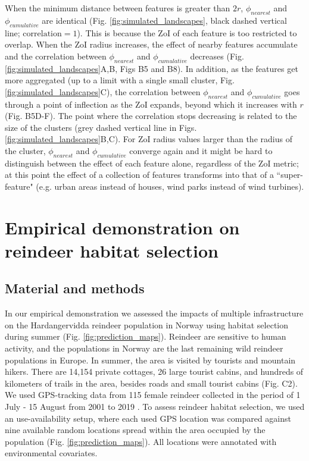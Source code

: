 \documentclass[titlepage]{article}
\begin{document}
When the minimum distance between features is greater than $2r$, $\phi_{nearest}$ and $\phi_{cumulative}$ are identical (Fig. \ref{fig:simulated_landscapes}, black dashed vertical line; $\text{correlation} = 1$). This is because the ZoI of each feature is too restricted to overlap. When the ZoI radius increases, the effect of nearby features accumulate and the correlation between $\phi_{nearest}$ and $\phi_{cumulative}$ decreases (Fig. \ref{fig:simulated_landscapes}A,B, Figs B5 and B8). In addition, as the features get more aggregated (up to a limit with a single small cluster, Fig. \ref{fig:simulated_landscapes}C), the correlation between $\phi_{nearest}$ and $\phi_{cumulative}$ goes through a point of inflection as the ZoI expands, beyond which it increases with $r$ (Fig. B5D-F). The point where the correlation stops decreasing is related to the size of the clusters (grey dashed vertical line in Figs. \ref{fig:simulated_landscapes}B,C). For ZoI radius values larger than the radius of the cluster, $\phi_{nearest}$ and $\phi_{cumulative}$ converge again 
and it might be hard to distinguish between the effect of each feature alone, regardless of the ZoI metric; at this point the effect of a collection of features transforms into that of a ``super-feature" (e.g. urban areas instead of houses, wind parks instead of wind turbines). 

\section{Empirical demonstration on reindeer habitat selection}

\subsection{Material and methods}

In our empirical demonstration we assessed the impacts of multiple infrastructure on the Hardangervidda reindeer population in Norway using habitat selection during summer (Fig. \ref{fig:prediction_maps}). Reindeer are sensitive to human activity, and the populations in Norway are the last remaining wild reindeer populations in Europe. In summer, the area is visited by tourists and mountain hikers. There are 14,154 private cottages, 26 large tourist cabins, and hundreds of kilometers of trails in the area, besides roads and small tourist cabins (Fig. C2). We used GPS-tracking data from 115 female reindeer collected in the period of 1 July - 15 August from 2001 to 2019 \citep[see][for further details]{panzacchi_searching_2015}. To assess reindeer habitat selection, we used an use-availability setup, where each used GPS location was compared against nine available random locations spread within the area occupied by the population (Fig. \ref{fig:prediction_maps}). All locations were annotated with environmental covariates.
\end{document}
